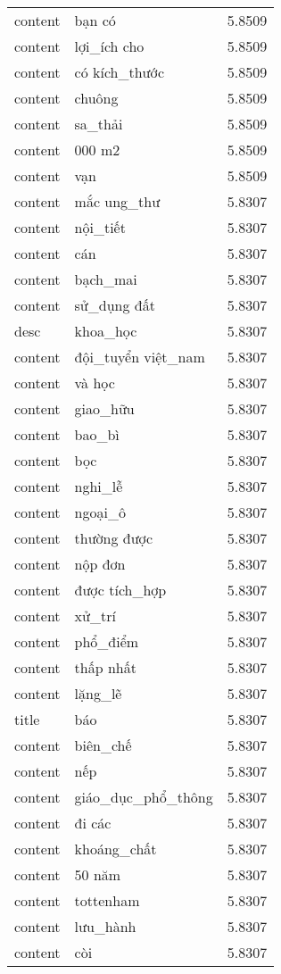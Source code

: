 \documentclass{article}
\begin{document}
\begin{tabular}{lll}
content & bạn có & 5.8509\\
content & lợi\_ích cho & 5.8509\\
content & có kích\_thước & 5.8509\\
content & chuông & 5.8509\\
content & sa\_thải & 5.8509\\
content & 000 m2 & 5.8509\\
content & vạn & 5.8509\\
content & mắc ung\_thư & 5.8307\\
content & nội\_tiết & 5.8307\\
content & cán & 5.8307\\
content & bạch\_mai & 5.8307\\
content & sử\_dụng đất & 5.8307\\
desc & khoa\_học & 5.8307\\
content & đội\_tuyển việt\_nam & 5.8307\\
content & và học & 5.8307\\
content & giao\_hữu & 5.8307\\
content & bao\_bì & 5.8307\\
content & bọc & 5.8307\\
content & nghi\_lễ & 5.8307\\
content & ngoại\_ô & 5.8307\\
content & thường được & 5.8307\\
content & nộp đơn & 5.8307\\
content & được tích\_hợp & 5.8307\\
content & xử\_trí & 5.8307\\
content & phổ\_điểm & 5.8307\\
content & thấp nhất & 5.8307\\
content & lặng\_lẽ & 5.8307\\
title & báo & 5.8307\\
content & biên\_chế & 5.8307\\
content & nếp & 5.8307\\
content & giáo\_dục\_phổ\_thông & 5.8307\\
content & đi các & 5.8307\\
content & khoáng\_chất & 5.8307\\
content & 50 năm & 5.8307\\
content & tottenham & 5.8307\\
content & lưu\_hành & 5.8307\\
content & còi & 5.8307\\

\end{tabular}
\end{document}

